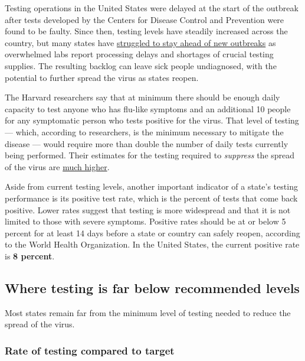 Testing operations in the United States were delayed at the start of the
outbreak after tests developed by the Centers for Disease Control and
Prevention were found to be faulty. Since then, testing levels have
steadily increased across the country, but many states have
\href{https://www.nytimes.com/2020/07/06/us/coronavirus-test-shortage.html}{struggled
to stay ahead of new outbreaks} as overwhelmed labs report processing
delays and shortages of crucial testing supplies. The resulting backlog
can leave sick people undiagnosed, with the potential to further spread
the virus as states reopen.

The Harvard researchers say that at minimum there should be enough daily
capacity to test anyone who has flu-like symptoms and an additional 10
people for any symptomatic person who tests positive for the virus. That
level of testing --- which, according to researchers, is the minimum
necessary to mitigate the disease --- would require more than double the
number of daily tests currently being performed. Their estimates for the
testing required to \emph{suppress} the spread of the virus are
\href{https://globalepidemics.org/july-6-2020-state-testing-targets/}{much
higher}.

Aside from current testing levels, another important indicator of a
state's testing performance is its positive test rate, which is the
percent of tests that come back positive. Lower rates suggest that
testing is more widespread and that it is not limited to those with
severe symptoms. Positive rates should be at or below 5 percent for at
least 14 days before a state or country can safely reopen, according to
the World Health Organization. In the United States, the current
positive rate is \textbf{8 percent}.

\hypertarget{where-testing-is-far-below-recommended-levels}{%
\subsection{Where testing is far below recommended
levels}\label{where-testing-is-far-below-recommended-levels}}

Most states remain far from the minimum level of testing needed to
reduce the spread of the virus.

\hypertarget{rate-of-testing-compared-to-target}{%
\subsubsection{Rate of testing compared to
target}\label{rate-of-testing-compared-to-target}}

